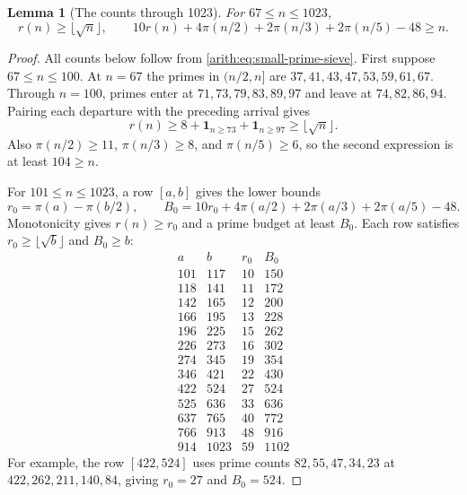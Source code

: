 \documentclass[11pt]{article}
\numberwithin{equation}{section}
\newtheorem{lemma}[theorem]{Lemma}
\theoremstyle{definition}\newtheorem{definition}[theorem]{Definition}
\theoremstyle{remark}\newtheorem{remark}[theorem]{Remark}
\begin{document}
\begin{lemma}[The counts through 1023]
\label{arith:lem:first-prime-budget-block}\label{arith:prop:written-low-range}
For $67\le n\le1023$,
\[
 r(n)\ge\lfloor\sqrt n\rfloor,\qquad
 10r(n)+4\pi(n/2)+2\pi(n/3)+2\pi(n/5)-48\ge n.
\]
\end{lemma}
\begin{proof}
All counts below follow from \eqref{arith:eq:small-prime-sieve}.
First suppose $67\le n\le100$. At $n=67$ the primes in $(n/2,n]$ are
$37,41,43,47,53,59,61,67$. Through $n=100$, primes enter at
$71,73,79,83,89,97$ and leave at $74,82,86,94$.
Pairing each departure with the preceding arrival gives
\[
 r(n)\ge8+\mathbf1_{n\ge73}+\mathbf1_{n\ge97}
       \ge\lfloor\sqrt n\rfloor.
\]
Also $\pi(n/2)\ge11$, $\pi(n/3)\ge8$, and $\pi(n/5)\ge6$,
so the second expression is at least $104\ge n$.

For $101\le n\le1023$, a row $[a,b]$ gives the lower bounds
\[
 r_0=\pi(a)-\pi(b/2),\qquad
 B_0=10r_0+4\pi(a/2)+2\pi(a/3)+2\pi(a/5)-48.
\]
Monotonicity gives $r(n)\ge r_0$ and a prime budget at least $B_0$.
Each row satisfies $r_0\ge\lfloor\sqrt b\rfloor$ and $B_0\ge b$:
\[
\begin{array}{rr|rr}
a&b&r_0&B_0\\\hline
101&117&10&150\\
118&141&11&172\\
142&165&12&200\\
166&195&13&228\\
196&225&15&262\\
226&273&16&302\\
274&345&19&354\\
346&421&22&430\\
422&524&27&524\\
525&636&33&636\\
637&765&40&772\\
766&913&48&916\\
914&1023&59&1102
\end{array}
\]
For example, the row $[422,524]$ uses prime counts
$82,55,47,34,23$ at $422,262,211,140,84$, giving
$r_0=27$ and $B_0=524$.
\end{proof}
\end{document}
